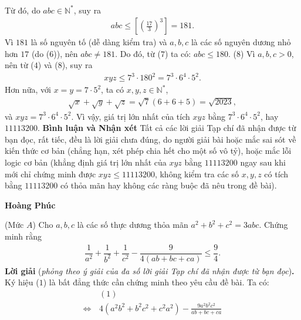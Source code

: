 \begin{multicols}{2}
\begin{align*}
	\end{align*}
	Từ đó, do $abc \in \mathbb{N^*}$,  suy ra
	\begin{align*}
		abc \le \left[ {{{\left( {\frac{{17}}{3}} \right)}^3}} \right] = 181. \tag{$7$}
	\end{align*}
	Vì $181$ là số nguyên tố (dễ dàng kiểm tra) và $a, b, c$ là các số nguyên dương nhỏ hơn $17$ (do ($6$)), nên $abc \ne 181$. Do đó, từ ($7$) ta có: $abc \le 180$. \hfill ($8$)
	\vskip 0.05cm
	Vì $a, b, c > 0$, nên từ ($4$) và ($8$), suy ra
	\begin{align*}
		xyz \le {7^3} \cdot {180^2} = {7^3} \cdot {6^4} \cdot {5^2}.
	\end{align*}
	Hơn nữa, với $x=y = 7\cdot 5^2$, ta có $x,y,z \in \mathbb{N^*}$,  
	\begin{align*}
		\sqrt x  + \sqrt y  + \sqrt z  = \sqrt 7 \left( {6 + 6 + 5} \right) = \sqrt {2023} ,
	\end{align*}
	và  $xyz = {7^3} \cdot {6^4} \cdot {5^2}.$
	\vskip 0.05cm
	Vì vậy, giá trị lớn nhất của tích $xyz$ bằng ${7^3} \cdot {6^4} \cdot {5^2}$,  hay $11113200$.
	\vskip 0.05cm
	\textbf{\color{thachthuctoanhoc}Bình luận và Nhận xét}
	\vskip 0.05cm
	Tất cả các lời giải Tạp chí đã nhận được từ bạn đọc, rất tiếc, đều là lời giải chưa đúng, do người giải bài hoặc mắc sai sót về kiến thức cơ bản (chẳng hạn, xét phép chia hết cho một số vô tỷ), hoặc mắc lỗi logic cơ bản (khẳng định giá trị lớn nhất của $xyz$ bằng $11113200$ ngay sau khi mới chỉ chứng minh được $xyz \le 11113200$, không kiểm tra các số $x, y, z$ có tích bằng $11113200$ có thỏa mãn hay không các ràng buộc đã nêu trong đề bài).
	\begin{flushright}
		\textbf{\color{thachthuctoanhoc}Hoàng Phúc}
	\end{flushright}
	{}
	(Mức $A$) Cho $a,b,c$ là các số thực dương thỏa mãn $a^2+b^2+c^2=3abc$. Chứng minh rằng
	\begin{align*}
		\dfrac{1}{a^2}+\dfrac{1}{b^2}+\dfrac{1}{c^2}-\dfrac{9}{4(ab+bc+ca)}\le \dfrac94.
	\end{align*}
	\textbf{\color{thachthuctoanhoc}Lời giải} (\textit{phỏng theo ý giải của đa số lời giải Tạp chí đã nhận được từ bạn đọc})\textbf{\color{thachthuctoanhoc}.}
	\vskip 0.05cm
	Ký hiệu ($1$) là bất đẳng thức cần chứng minh theo yêu cầu đề bài. Ta có:
	\columnbreak
	\begin{align*}
		&(1)\\
		\Leftrightarrow\,& 4\left( {{a^2}{b^2} + {b^2}{c^2} + {c^2}{a^2}} \right) - \frac{{9{a^2}{b^2}{c^2}}}{{ab + bc + ca}} \\

\end{align*}
\end{multicols}
